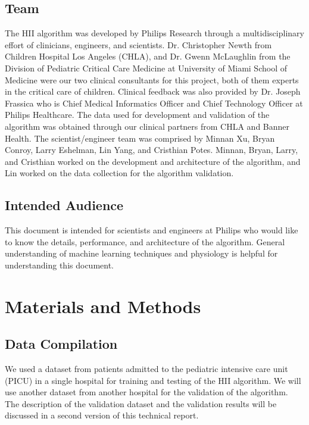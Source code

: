 \documentclass[
   technote
]{phildoc}
\newcommand{\hii}{HII}
\begin{document}
\section{Team}
The \hii{} algorithm was developed by Philips Research through a multidisciplinary effort of clinicians, engineers, and scientists. Dr. Christopher Newth from Children Hospital Los Angeles (CHLA), and Dr. Gwenn McLaughlin from the Division of Pediatric Critical Care Medicine at University of Miami School of Medicine were our two clinical consultants for this project, both of them experts in the critical care of children. Clinical feedback was also provided by Dr. Joseph Frassica who is Chief Medical Informatics Officer and Chief Technology Officer at Philips Healthcare. The data used for development and validation of the algorithm was obtained through our clinical partners from CHLA and Banner Health. The scientist/engineer team was comprised by Minnan Xu, Bryan Conroy, Larry Eshelman, Lin Yang, and Cristhian Potes.  Minnan, Bryan, Larry, and Cristhian worked on the development and architecture of the algorithm, and Lin worked on the data collection for the algorithm validation.         


\section{Intended Audience}
This document is intended for scientists and engineers at Philips who would like to know the details, performance, and architecture of the algorithm. General understanding of machine learning techniques and physiology is helpful for understanding this document. 


\chapter{Materials and Methods}
\label{methods}

\section{Data Compilation} 
\label{sec:data_compilation}
We used a dataset from patients admitted to the pediatric intensive care unit (PICU) in a single hospital for training and testing of the \hii{} algorithm. We will use another dataset from another hospital for the validation of the algorithm. The description of the validation dataset and the validation results will be discussed in a second version of this technical report. 

\end{document}
